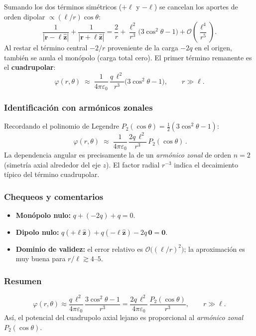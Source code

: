 \documentclass{article}
\begin{document}
Sumando los dos términos simétricos ($+\ell$ y $-\ell$) se cancelan los aportes de orden dipolar $\propto (\ell/r)\cos\theta$:
\[
\frac{1}{|\mathbf r-\ell\hat{\mathbf z}|}+\frac{1}{|\mathbf r+\ell\hat{\mathbf z}|}
=\frac{2}{r}+\frac{\ell^{2}}{r^{3}}\big(3\cos^{2}\theta-1\big)
+\mathcal O\!\left(\frac{\ell^{4}}{r^{5}}\right).
\]
Al restar el término central $-2/r$ proveniente de la carga $-2q$ en el origen, también se anula el monópolo (carga total cero). El primer término remanente es el \textbf{cuadrupolar}:
\[
\boxed{\ 
\varphi(r,\theta)\;\approx\;\frac{1}{4\pi\varepsilon_0}\,
\frac{q\,\ell^{2}}{r^{3}}\big(3\cos^{2}\theta-1\big),
\qquad r\gg \ell.\ }
\]

\subsubsection*{Identificación con armónicos zonales}
Recordando el polinomio de Legendre $P_2(\cos\theta)=\tfrac12(3\cos^{2}\theta-1)$:
\[
\boxed{\ 
\varphi(r,\theta)\;\approx\;\frac{1}{4\pi\varepsilon_0}\,
\frac{2q\,\ell^{2}}{r^{3}}\,P_2(\cos\theta)\,.
}
\]
La dependencia angular es precisamente la de un \emph{armónico zonal} de orden $n=2$ (simetría axial alrededor del eje $z$). El factor radial $r^{-3}$ indica el decaimiento típico del término cuadrupolar.

\subsubsection*{Chequeos y comentarios}
\begin{itemize}
\item \textbf{Monópolo nulo:} $q+(-2q)+q=0$.
\item \textbf{Dipolo nulo:} $q(+\ell\hat{\mathbf z})+q(-\ell\hat{\mathbf z})-2q\,\mathbf 0=\mathbf 0$.
\item \textbf{Dominio de validez:} el error relativo es $\mathcal O\!\big((\ell/r)^{2}\big)$; la aproximación es muy buena para $r/\ell\gtrsim 4\text{--}5$.
\end{itemize}

\subsubsection*{Resumen}
\[
\boxed{\ \varphi(r,\theta)\approx
\frac{q\,\ell^{2}}{4\pi\varepsilon_0}\,\frac{3\cos^{2}\theta-1}{r^{3}}
=\frac{2q\,\ell^{2}}{4\pi\varepsilon_0}\,\frac{P_{2}(\cos\theta)}{r^{3}},
\qquad r\gg \ell. \ }
\]
Así, el potencial del cuadrupolo axial lejano es proporcional al \emph{armónico zonal} $P_2(\cos\theta)$.
\end{document}
